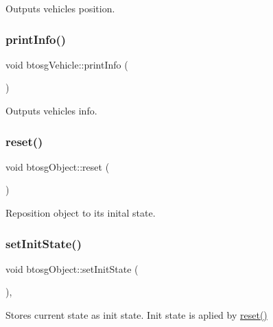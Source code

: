 Outputs vehicle\textquotesingle{}s position. \mbox{\label{classbtosgVehicle_abe98f64f0a8f37c7c0b244e3afbbcb15}} 
\subsubsection{\texorpdfstring{printInfo()}{printInfo()}}
{\footnotesize\ttfamily void btosg\+Vehicle\+::print\+Info (\begin{DoxyParamCaption}{ }\end{DoxyParamCaption})\hspace{0.3cm}{\ttfamily [inline]}}

Outputs vehicle\textquotesingle{}s info. \mbox{\label{classbtosgObject_a93983f9180dd0672f8779cf2baa78580}} 
\subsubsection{\texorpdfstring{reset()}{reset()}}
{\footnotesize\ttfamily void btosg\+Object\+::reset (\begin{DoxyParamCaption}{ }\end{DoxyParamCaption})\hspace{0.3cm}{\ttfamily [inherited]}}

Reposition object to its inital state. \mbox{\label{classbtosgObject_ad1508a0ce28cfac83e5f0ff6245f91b5}} 
\subsubsection{\texorpdfstring{setInitState()}{setInitState()}\hspace{0.1cm}{\footnotesize\ttfamily [1/2]}}
{\footnotesize\ttfamily void btosg\+Object\+::set\+Init\+State (\begin{DoxyParamCaption}{ }\end{DoxyParamCaption})\hspace{0.3cm}{\ttfamily [inline]}, {\ttfamily [inherited]}}

Stores current state as init state. Init state is aplied by \mbox{\hyperlink{classbtosgObject_a93983f9180dd0672f8779cf2baa78580}{reset()}} \mbox{\label{classbtosgObject_a6ceb08e59ee95acaaef389ee198d2b56}} 
